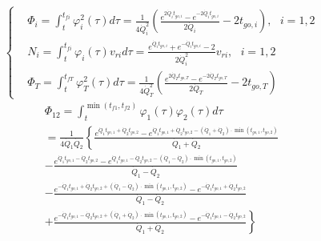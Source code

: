 \begin{equation}
\label{eq:52}
\left\{
\begin{aligned}
& {\Phi _i} = \int_t^{{t_{fi}}} {\varphi _i^2} (\tau )d\tau  = \frac{1}{{4\dot Q_i^2}}\left( {\frac{{{e^{2{{\dot Q}_i}{t_{go,i}}}} - {e^{ - 2{{\dot Q}_i}{t_{go,i}}}}}}{{2{{\dot Q}_i}}} - 2{t_{go,i}}} \right),{\text{ }}i = 1,2 \\
& {N_i} = \int_t^{{t_{fi}}} {{\varphi _i}} (\tau ){v_{ri}}d\tau  = \frac{{{e^{{{\dot Q}_i}{t_{go,i}}}} + {e^{ - {{\dot Q}_i}{t_{go,i}}}} - 2}}{{2\dot Q_i^2}}{v_{ri}},{\text{ }}i = 1,2 \\
& {\Phi _T} = \int_t^{{t_{fT}}} {\varphi _T^2} (\tau )d\tau  = \frac{1}{{4\dot Q_T^2}}\left( {\frac{{{e^{2{{\dot Q}_T}{t_{go,T}}}} - {e^{ - 2{{\dot Q}_T}{t_{go,T}}}}}}{{2{{\dot Q}_T}}} - 2{t_{go,T}}} \right)
\end{aligned}
\right.
\end{equation}
\begin{equation}
\label{eq:53}
\begin{gathered}
  {\Phi _{12}} = \int_t^{\min ({t_{f1}},{t_{f2}})} {{\varphi _1}(\tau ){\varphi _2}(\tau )} d\tau  \\ 
   = \frac{1}{{4{{\dot Q}_1}{{\dot Q}_2}}}\left\{ {\frac{{{e^{{{\dot Q}_1}{t_{go,1}} + {{\dot Q}_2}{t_{go,2}}}} - {e^{{{\dot Q}_1}{t_{go,1}} + {{\dot Q}_2}{t_{go,2}} - ({{\dot Q}_1} + {{\dot Q}_2}) \cdot \min ({t_{go,1}},{t_{go,2}})}}}}{{{{\dot Q}_1} + {{\dot Q}_2}}}} \right. \\ 
   - \frac{{{e^{{{\dot Q}_1}{t_{go,1}} - {{\dot Q}_2}{t_{go,2}}}} - {e^{{{\dot Q}_1}{t_{go,1}} - {{\dot Q}_2}{t_{go,2}} - ({{\dot Q}_1} - {{\dot Q}_2}) \cdot \min ({t_{go,1}},{t_{go,2}})}}}}{{{{\dot Q}_1} - {{\dot Q}_2}}} \\ 
   - \frac{{{e^{ - {{\dot Q}_1}{t_{go,1}} + {{\dot Q}_2}{t_{go,2}} + ({{\dot Q}_1} - {{\dot Q}_2}) \cdot \min ({t_{go,1}},{t_{go,2}})}} - {e^{ - {{\dot Q}_1}{t_{go,1}} + {{\dot Q}_2}{t_{go,2}}}}}}{{{{\dot Q}_1} - {{\dot Q}_2}}} \\ 
  \left. { + \frac{{{e^{ - {{\dot Q}_1}{t_{go,1}} - {{\dot Q}_2}{t_{go,2}} + ({{\dot Q}_1} + {{\dot Q}_2}) \cdot \min ({t_{go,1}},{t_{go,2}})}} - {e^{ - {{\dot Q}_1}{t_{go,1}} - {{\dot Q}_2}{t_{go,2}}}}}}{{{{\dot Q}_1} + {{\dot Q}_2}}}} \right\} \\ 
\end{gathered}
\end{equation}
